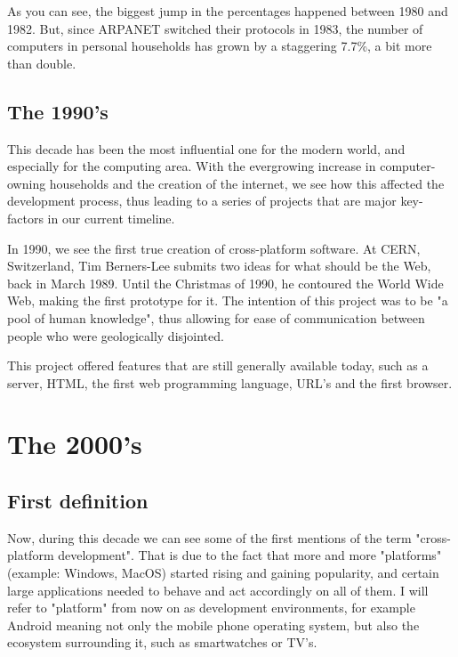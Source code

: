 \par
As you can see, the biggest jump in the percentages happened between 1980 and 1982.
But, since ARPANET switched their protocols in 1983, the number of computers in personal households has grown by a staggering 7.7\%, a bit more than double.



\subsection{The 1990's}
This decade has been the most influential one for the modern world, and especially for the computing area.
With the evergrowing increase in computer-owning households and the creation of the internet, we see how this affected the development process, thus leading to a series of projects that are major key-factors in our current timeline.

\par
In 1990, we see the first true creation of cross-platform software.
At CERN, Switzerland, Tim Berners-Lee submits two ideas for what should be the Web, back in March 1989.
Until the Christmas of 1990, he contoured the World Wide Web, making the first prototype for it.
The intention of this project was to be "a pool of human knowledge", thus allowing for ease of communication between people who were geologically disjointed\cite{worldWideWeb}.

\par
This project offered features that are still generally available today, such as a server, HTML, the first web programming language, URL's and the first browser.

\section{The 2000's}
\subsection{First definition}
Now, during this decade we can see some of the first mentions of the term "cross-platform development".
That is due to the fact that more and more "platforms" (example: Windows, MacOS) started rising and gaining popularity, and certain large applications needed to behave and act accordingly on all of them.
I will refer to "platform" from now on as development environments, for example Android meaning not only the mobile phone operating system, but also the ecosystem surrounding it, such as smartwatches or TV's.


